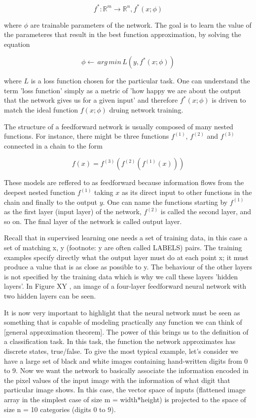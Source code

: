 $$ f^*: \mathbb{R}^m \rightarrow \mathbb{R}^n, f^*(x;\phi) $$

where $ \phi $ are trainable parameters of the network. The goal is to learn the value of the parameteres that result in the best function approximation, by solving the equation

$$ \phi \leftarrow \, arg \, min \, L(y, f^*(x;\phi)) $$

where $ L $ is a loss function chosen for the particular task. One can understand the term 'loss function' simply as a metric of 'how happy we are about the output that the network gives us for a given input' and therefore $f^*(x;\phi)$ is driven to match the ideal function $f(x;\phi)$ druing network training. 

The structure of a feedforward network is usually composed of many nested functions. For instance, there might be three functions $f^{(1)}$, $f^{(2)}$ and $f^{(3)}$ connected in a chain to the form

$$ f(x) = f^{(3)}(f^{(2)}(f^{(1)}(x))) $$

These models are reffered to as feedforward because information flows from the deepest nested function $f^{(1)}$ taking $ x $ as its direct input to other functions in the chain and finally to the output $ y $. One can name the functions starting by $f^{(1)}$ as the first layer (input layer) of the network, $f^{(2)}$ is called the second layer, and so on. The final layer of the network is called output layer. 

Recall that in supervised learning one needs a set of training data, in this case a set of matching x, y (footnote: y are often called LABELS) pairs. The training examples specify directly what the output layer must do at each point x; it must produce a value that is as close as possible to y. The behaviour of the other layers is not specified by the training data which is why we call these layers 'hidden layers'. In Figure XY , an image of a four-layer feedforward neural network with two hidden layers can be seen.

It is now very important to highlight that the neural network must be seen as something that is capable of modeling practically any function we can think of [general approximation theorem]. The power of this brings us to the definition of a classification task. In this task, the function the network approximates has discrete states, true/false. To give the most typical example, let's consider we have a large set of black and white images containing hand-written digits from 0 to 9. Now we want the network to basically associate the information encoded in the pixel values of the input image with the information of what digit that particular image shows. In this case, the vector space of inputs (flattened image array in the simplest case of size m = width*height) is projected to the space of size n = 10 categories (digits 0 to 9). 

